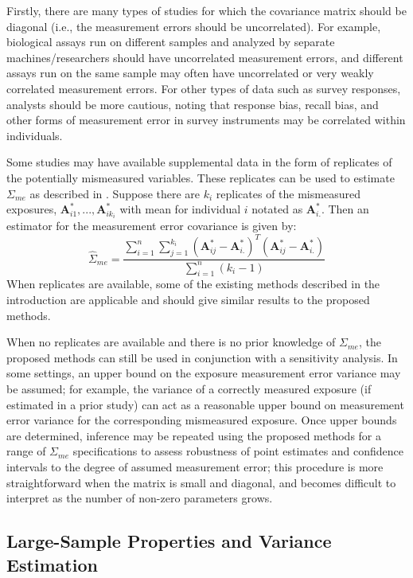 \documentclass[useAMS,usenatbib,referee]{biom}
\begin{document}
Firstly, there are many types of studies for which the covariance matrix should be diagonal (i.e., the measurement errors should be uncorrelated). For example, biological assays run on different samples and analyzed by separate machines/researchers should have uncorrelated measurement errors, and different assays run on the same sample may often have uncorrelated or very weakly correlated measurement errors. For other types of data such as survey responses, analysts should be more cautious, noting that response bias, recall bias, and other forms of measurement error in survey instruments may be correlated within individuals.

Some studies may have available supplemental data in the form of replicates of the potentially mismeasured variables. These replicates can be used to estimate $\Sigma_{me}$ as described in \citet{carroll2006}. Suppose there are $k_{i}$ replicates of the mismeasured exposures, $\bm{A}^{*}_{i1}, ..., \bm{A}^{*}_{ik_{i}}$ with mean for individual $i$ notated as $\bm{A}^{*}_{i.}$. Then an estimator for the measurement error covariance is given by:
\begin{equation*}
    \hat{\Sigma}_{me} = \frac{\sum_{i=1}^{n} \sum_{j=1}^{k_{i}} (\bm{A}^{*}_{ij} - \bm{A}^{*}_{i.})^{T}(\bm{A}^{*}_{ij} - \bm{A}^{*}_{i.})}{\sum_{i=1}^{n}(k_{i} - 1)}
\end{equation*}
When replicates are available, some of the existing methods described in the introduction are applicable and should give similar results to the proposed methods.

When no replicates are available and there is no prior knowledge of $\Sigma_{me}$, the proposed methods can still be used in conjunction with a sensitivity analysis. In some settings, an upper bound on the exposure measurement error variance may be assumed; for example, the variance of a correctly measured exposure (if estimated in a prior study) can act as a reasonable upper bound on measurement error variance for the corresponding mismeasured exposure. Once upper bounds are determined, inference may be repeated using the proposed methods for a range of $\Sigma_{me}$ specifications to assess robustness of point estimates and confidence intervals to the degree of assumed measurement error; this procedure is more straightforward when the matrix is small and diagonal, and becomes difficult to interpret as the number of non-zero parameters grows.

\subsection{Large-Sample Properties and Variance Estimation}
\end{document}
